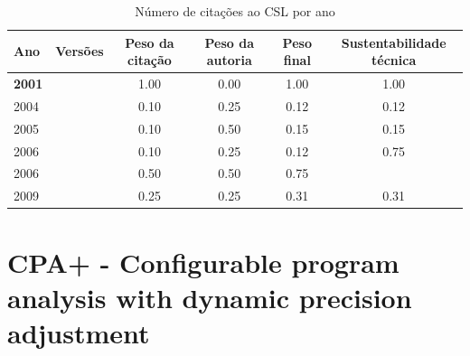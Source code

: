 \begin{table}[H]
\caption{Número de citações ao CSL  por ano}
\centering
\begin{tabular}{| l | c | c | c | c | c |}
  \hline
  Ano & Versões & Peso da citação & Peso da autoria & Peso final & Sustentabilidade técnica \\
  \hline
            {\bf 2001}
          &
          
          &
          1.00
          &
          0.00
          &
          1.00
          &
            {\color{blue} 1.00}
          \\
\hline
            2004
          &
          
          &
          0.10
          &
          0.25
          &
          0.12
          &
            {\color{red} 0.12}
          \\
\hline
            2005
          &
          
          &
          0.10
          &
          0.50
          &
          0.15
          &
            {\color{red} 0.15}
          \\
\hline
            2006
          &
          
          &
          0.10
          &
          0.25
          &
          0.12
          &
            {\color{blue} 0.75}
          \\
            2006
          &
          
          &
          0.50
          &
          0.50
          &
          0.75
          &
          \\
\hline
            2009
          &
          
          &
          0.25
          &
          0.25
          &
          0.31
          &
            {\color{red} 0.31}
          \\
\hline
\end{tabular}
\end{table}



\section{CPA+ - Configurable program analysis with dynamic precision adjustment}


